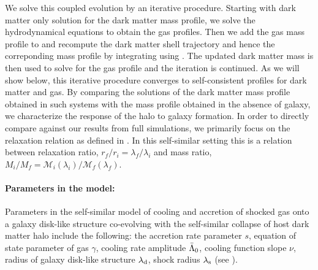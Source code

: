We solve this coupled evolution by an iterative procedure. Starting with dark matter only solution for the dark matter mass profile, we solve the hydrodynamical equations to obtain the gas profiles. Then we add the gas mass profile to  and recompute the dark matter shell trajectory and hence the correponding mass profile by integrating using . The updated dark matter mass is then used to solve for the gas profile and the iteration is continued. As we will show below, this iterative procedure converges to self-consistent profiles for dark matter and gas. By comparing the solutions of the dark matter mass profile obtained in such systems with the mass profile obtained in the absence of galaxy, we characterize the response of the halo to galaxy formation. 
In order to directly compare against our results from full simulations, we primarily focus on the relaxation relation as defined in . In this self-similar setting this is a relation between relaxation ratio, $r_f/r_i=\lambda_f/\lambda_i$ and mass ratio, $M_i/M_f=\mathcal{M}_i(\lambda_i)/\mathcal{M}_f(\lambda_f)$.



\paragraph{Parameters in the model:}
Parameters in the self-similar model of cooling and accretion of shocked gas onto a galaxy disk-like structure co-evolving with the self-similar collapse of host dark matter halo include the following:
the accretion rate parameter $s$, equation of state parameter of gas $\gamma$, cooling rate amplitude $\Bar{\Lambda}_0$, cooling function slope $\nu$, radius of galaxy disk-like structure $\lambda_{\rm d}$, shock radius $\lambda_{\rm s}$ (see ).


